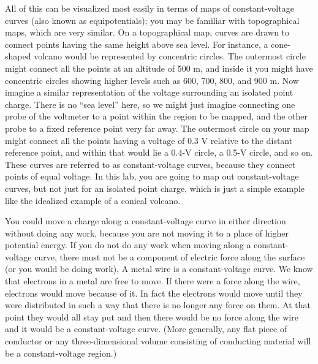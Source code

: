 All of this can be visualized most easily in terms of maps
of constant-voltage curves (also known as equipotentials); you may be familiar with topographical
maps, which are very similar. On a topographical map, curves
are drawn to connect points having the same height above sea
level. For instance, a cone-shaped volcano would be
represented by concentric circles. The outermost circle
might connect all the points at an altitude of 500 m, and
inside it you might have concentric circles showing higher
levels such as 600, 700, 800, and 900 m. Now imagine a
similar representation of the voltage surrounding an
isolated point charge. There is no ``sea level'' here, so we
might just imagine connecting one probe of the voltmeter to
a point within the region to be mapped, and the other probe
to a fixed reference point very far away. The outermost
circle on your map might connect all the points having a
voltage of 0.3 V relative to the distant reference point,
and within that would lie a 0.4-V circle, a 0.5-V circle,
and so on. These curves are referred to as constant-voltage curves,
because they connect points of equal voltage.
In this lab, you are going to map out
constant-voltage curves, but not just for an isolated point charge,
which is just a simple example like the idealized example
of a conical volcano.

You could move a charge along a constant-voltage curve in either
direction without doing any work, because you are not moving
it to a place of higher potential energy.  If you do not do
any work when moving along a constant-voltage curve, there must not
be a component of electric force along the surface (or you
would be doing work). A metal wire is a constant-voltage curve. We
know that electrons in a metal are free to move. If there
were a force along the wire, electrons would move because of
it. In fact the electrons would move until they were
distributed in such a way that there is no longer any force
on them. At that point they would all stay put and then
there would be no force along the wire and it would be a
constant-voltage curve. (More generally, any flat piece of conductor
or any three-dimensional volume consisting of conducting
material will be a constant-voltage  region.)

